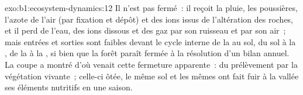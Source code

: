 \begin{solution}{exo:b1:ecosystem-dynamics:12}
Il n'est pas fermé~: il reçoit la pluie, les poussières, l'azote de
l'air (par fixation et dépôt) et des ions issus de l'altération des
roches, et il perd de l'eau, des ions dissous et des gaz par son
ruisseau et par son air~; mais entrées et sorties sont faibles devant le
cycle interne de la  au sol, du sol à la , de la  à
la , si bien que la forêt paraît fermée à la résolution d'un
bilan annuel. La coupe a montré d'où venait cette fermeture apparente~:
du prélèvement par la végétation vivante~; celle-ci ôtée, le même sol et
les mêmes  ont fait fuir à la vallée ses éléments nutritifs
en une saison.
\end{solution}

